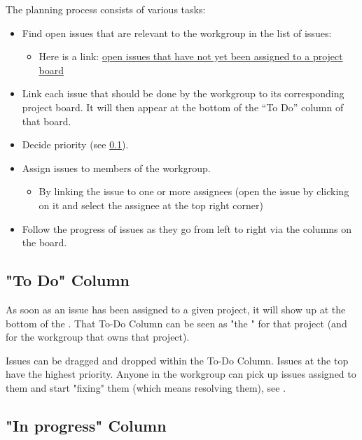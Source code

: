 The planning process consists of various tasks:

\begin{itemize}
    \item Find open issues that are relevant to the workgroup in the list of issues:
    \begin{itemize}
        \item Here is a link: \href{https://github.com/EKGF/ekg-mm/issues?q=is%3Aissue+is%3Aopen+no%3Aproject}
              {open issues that have not yet been assigned to a project board}
    \end{itemize}
    \item Link each issue that should be done by the workgroup to its
          corresponding project board.
          It will then appear at the bottom of the “To Do” column of that board.
    \item Decide priority (see \ref{subsec:ekg-mm-process-to-do-column}).
    \item Assign issues to members of the workgroup.
    \begin{itemize}
        \item By linking the issue to one or more assignees
              (open the issue by clicking on it and select the assignee at
              the top right corner)
    \end{itemize}
    \item Follow the progress of issues as they go from left to right via the columns on the board.
\end{itemize}

\subsection{"To Do" Column}
\label{subsec:ekg-mm-process-to-do-column}

As soon as an issue has been assigned to a given project, 
it will show up at the bottom of the . 
That To-Do Column can be seen as "the "
for that project (and for the workgroup that owns that project).

Issues can be dragged and dropped within the To-Do Column. 
Issues at the top have the highest priority. 
Anyone in the workgroup can pick up issues assigned to 
them and start "fixing" them (which means resolving them), 
see .

\subsection{"In progress" Column}

